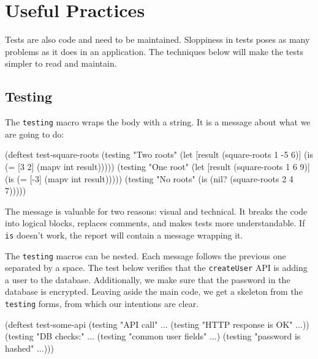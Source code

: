 \section{Useful Practices}

Tests are also code and need to be maintained. Sloppiness in tests poses as many problems as it does in an application. The techniques below will make the tests simpler to read and maintain.

\subsection{Testing}


The \verb|testing| macro wraps the body with a string. It is a message about what we are going to do:

\begin{english}
  \begin{clojure}
(deftest test-square-roots
  (testing "Two roots"
    (let [result (square-roots 1 -5 6)]
      (is (= [3 2] (mapv int result)))))
  (testing "One root"
    (let [result (square-roots 1 6 9)]
      (is (= [-3] (mapv int result)))))
  (testing "No roots"
    (is (nil? (square-roots 2 4 7)))))
  \end{clojure}
\end{english}

The message is valuable for two reasons: visual and technical. It breaks the code into logical blocks, replaces comments, and makes tests more understandable. If \verb|is| doesn't work, the report will contain a message wrapping it.

The \verb|testing| macros can be nested. Each message follows the previous one separated by a space. The test below verifies that the \verb|createUser| API is adding a user to the database. Additionally, we make sure that the password in the database is encrypted. Leaving aside the main code, we get a skeleton from the \verb|testing| forms, from which our intentions are clear.

\begin{english}
  \begin{clojure}
(deftest test-some-api
  (testing "API call" ...
    (testing "HTTP response is OK" ...))
  (testing "DB checks:" ...
    (testing "common user fields" ...)
    (testing "password is hashed" ...)))
  \end{clojure}
\end{english}

